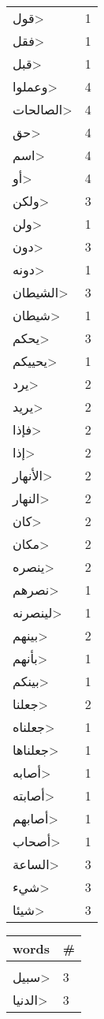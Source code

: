 \documentclass{article}
\begin{document}
\begin{multicols}{6}
\begin{center}
\begin{tabular}{ P{2cm}  P{1cm}}
\<قول> & 1 \\ 
\<فقل> & 1 \\ 
\<قبل> & 1 \\ 
\<وعملوا> & 4 \\ 
\<الصالحات> & 4 \\ 
\<حق> & 4 \\ 
\<اسم> & 4 \\ 
\<أو> & 4 \\ 
\<ولكن> & 3 \\ 
\<ولن> & 1 \\ 
\<دون> & 3 \\ 
\<دونه> & 1 \\ 
\<الشيطان> & 3 \\ 
\<شيطان> & 1 \\ 
\<يحكم> & 3 \\ 
\<يحييكم> & 1 \\ 
\<يرد> & 2 \\ 
\<يريد> & 2 \\ 
\<فإذا> & 2 \\ 
\<إذا> & 2 \\ 
\<الأنهار> & 2 \\ 
\<النهار> & 2 \\ 
\<كان> & 2 \\ 
\<مكان> & 2 \\ 
\<ينصره> & 2 \\ 
\<نصرهم> & 1 \\ 
\<لينصرنه> & 1 \\ 
\<بينهم> & 2 \\ 
\<بأنهم> & 1 \\ 
\<بينكم> & 1 \\ 
\<جعلنا> & 2 \\ 
\<جعلناه> & 1 \\ 
\<جعلناها> & 1 \\ 
\<أصابه> & 1 \\ 
\<أصابته> & 1 \\ 
\<أصابهم> & 1 \\ 
\<أصحاب> & 1 \\ 
\<الساعة> & 3 \\ 
\<شيء> & 3 \\ 
\<شيئا> & 3 \\ 
\end{tabular} 
\begin{tabular}{ P{2cm}  P{1cm}} 
\textbf{words}    & \textbf{\#}  \\
\hline
\\[0.01cm]
\<سبيل> & 3 \\ 
\<الدنيا> & 3 \\ 

\end{tabular}
\end{center}
\end{multicols}
\end{document}
